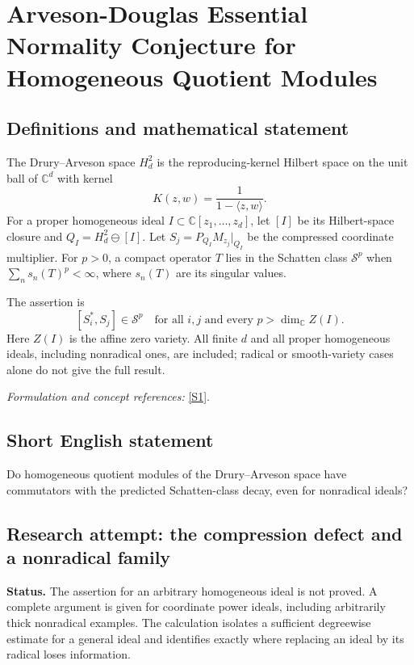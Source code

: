\documentclass[11pt]{article}
\begin{document}
\section*{\texorpdfstring{Arveson-Douglas Essential Normality Conjecture for Homogeneous Quotient Modules}{Arveson-Douglas Essential Normality Conjecture for Homogeneous Quotient Modules}}\label{statement}
\subsection{Definitions and mathematical statement}
The Drury--Arveson space $H_d^2$ is the reproducing-kernel Hilbert space on the unit ball of ${\mathbb{C}}^d$ with kernel
\[
 K(z,w)=\frac1{1-\langle z,w\rangle}.
\]
For a proper homogeneous ideal $I\subset{\mathbb{C}}[z_1,\ldots,z_d]$, let $[I]$ be its Hilbert-space closure and $Q_I=H_d^2\ominus[I]$. Let $S_j=P_{Q_I}M_{z_j}|_{Q_I}$ be the compressed coordinate multiplier. For $p>0$, a compact operator $T$ lies in the Schatten class $\mathcal S^p$ when $\sum_ns_n(T)^p<\infty$, where $s_n(T)$ are its singular values.

The assertion is
\[
 [S_i^*,S_j]\in\mathcal S^p
 \quad\text{for all }i,j\text{ and every }p>\dim_{{\mathbb{C}}} Z(I).
\]
Here $Z(I)$ is the affine zero variety. All finite $d$ and all proper homogeneous ideals, including nonradical ones, are included; radical or smooth-variety cases alone do not give the full result.
\par\smallskip\textit{Formulation and concept references:} \href{https://users.math.cas.cz/~englis/85.pdf}{[S1]}.

\subsection{Short English statement}
Do homogeneous quotient modules of the Drury--Arveson space have commutators with the predicted Schatten-class decay, even for nonradical ideals?
\subsection{Research attempt: the compression defect and a nonradical family}
\textbf{Status.} The assertion for an arbitrary homogeneous ideal is not proved. A complete argument is given for coordinate power ideals, including arbitrarily thick nonradical examples. The calculation isolates a sufficient degreewise estimate for a general ideal and identifies exactly where replacing an ideal by its radical loses information.
\end{document}
